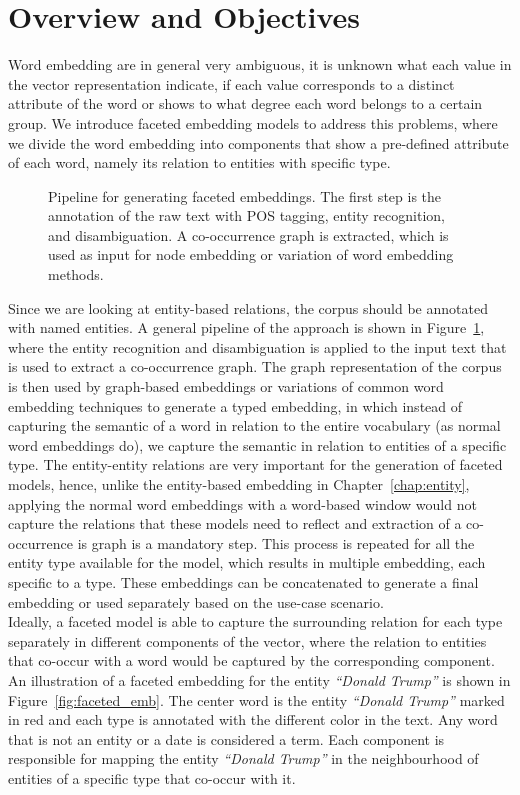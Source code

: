 \section{Overview and Objectives}\label{sec:faceted_overview}
Word embedding are in general very ambiguous, it is unknown what each value in the vector representation indicate, if each value corresponds to a distinct attribute of the word or shows to what degree each word belongs to a certain group. We introduce faceted embedding models to address this problems, where we divide the word embedding into components that show a pre-defined attribute of each word, namely its relation to entities with specific type. 
\begin{figure}
\centering 
\resizebox{0.97\textwidth}{0.16\textwidth}{      

}
\caption{Pipeline for generating faceted embeddings. The first step is the annotation of the raw text with POS tagging, entity recognition, and disambiguation. A co-occurrence graph is extracted, which is used as input for node embedding or variation of word embedding methods.   }
\label{fig:facetted_pipeline}
\end{figure}
Since we are looking at entity-based relations, the corpus should be annotated with named entities. A general pipeline of the approach is shown in Figure~\ref{fig:facetted_pipeline}, where the entity recognition and disambiguation is applied to the input text that  is used to extract a co-occurrence graph. The graph representation of the corpus is then used by graph-based embeddings or variations of common word embedding techniques to generate a typed embedding, in which instead of capturing the semantic of a word in relation to the entire vocabulary (as normal word embeddings do), we capture the semantic in relation to entities of a specific type. The entity-entity relations are very important for the generation of faceted models, hence, unlike the entity-based embedding in Chapter~\ref{chap:entity}, applying the normal word embeddings with a word-based window would not capture the relations that these models need to reflect and extraction of a co-occurrence is graph is a mandatory step. This process is repeated for all the entity type available for the model, which results in multiple embedding, each specific to a type. These embeddings can be concatenated to generate a final embedding or used separately based on the use-case scenario. \\
Ideally, a faceted model is able to capture the surrounding relation for each type separately in different components of the vector, where the relation to entities that co-occur with a word would be captured by the corresponding component. An illustration of a faceted embedding for the entity \emph{``Donald Trump''} is shown in Figure~\ref{fig:faceted_emb}. The center word is the entity \emph{``Donald Trump''} marked in red and each type is annotated with the different color in the text. Any word that is not an entity or a date is considered a term. Each component is responsible for mapping the entity \emph{``Donald Trump''} in the neighbourhood of entities of a specific type that co-occur with it. \\
